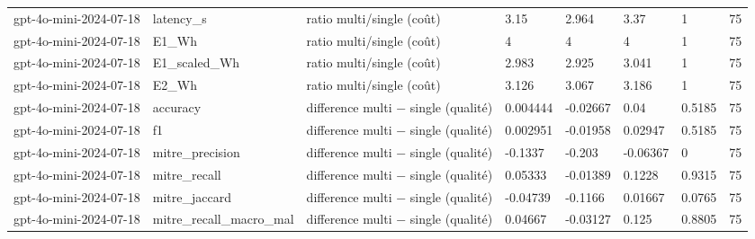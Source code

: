 \begin{table}[!t]
\begin{tabular}{llllllll}
gpt-4o-mini-2024-07-18 & latency\_s & ratio multi/single (coût) & 3.15 & 2.964 & 3.37 & 1 & 75 \\
gpt-4o-mini-2024-07-18 & E1\_Wh & ratio multi/single (coût) & 4 & 4 & 4 & 1 & 75 \\
gpt-4o-mini-2024-07-18 & E1\_scaled\_Wh & ratio multi/single (coût) & 2.983 & 2.925 & 3.041 & 1 & 75 \\
gpt-4o-mini-2024-07-18 & E2\_Wh & ratio multi/single (coût) & 3.126 & 3.067 & 3.186 & 1 & 75 \\
gpt-4o-mini-2024-07-18 & accuracy & difference multi − single (qualité) & 0.004444 & -0.02667 & 0.04 & 0.5185 & 75 \\
gpt-4o-mini-2024-07-18 & f1 & difference multi − single (qualité) & 0.002951 & -0.01958 & 0.02947 & 0.5185 & 75 \\
gpt-4o-mini-2024-07-18 & mitre\_precision & difference multi − single (qualité) & -0.1337 & -0.203 & -0.06367 & 0 & 75 \\
gpt-4o-mini-2024-07-18 & mitre\_recall & difference multi − single (qualité) & 0.05333 & -0.01389 & 0.1228 & 0.9315 & 75 \\
gpt-4o-mini-2024-07-18 & mitre\_jaccard & difference multi − single (qualité) & -0.04739 & -0.1166 & 0.01667 & 0.0765 & 75 \\
gpt-4o-mini-2024-07-18 & mitre\_recall\_macro\_mal & difference multi − single (qualité) & 0.04667 & -0.03127 & 0.125 & 0.8805 & 75 \\
\hline
\end{tabular}
\end{table}

